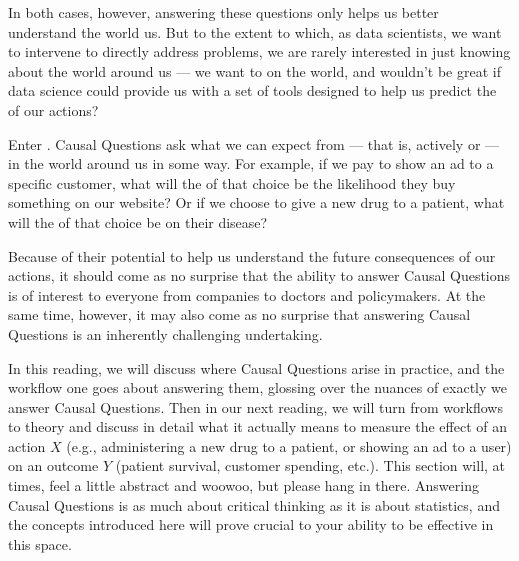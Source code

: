 \documentclass[letterpaper,10pt,english]{jupyterBook}
\begin{document}
\sphinxAtStartPar
In both cases, however, answering these questions only helps us better understand the world  us. But to the extent to which, as data scientists, we want to intervene to directly address problems, we are rarely interested in just knowing about the world around us — we want to  on the world, and wouldn’t be great if data science could provide us with a set of tools designed to help us predict the  of our actions?

\sphinxAtStartPar
Enter . Causal Questions ask what  we can expect from  — that is, actively  or  — in the world around us in some way. For example, if we pay to show an ad to a specific customer, what will the  of that choice be the likelihood they buy something on our website? Or if we choose to give a new drug to a patient, what will the  of that choice be on their disease?

\sphinxAtStartPar
Because of their potential to help us understand the future consequences of our actions, it should come as no surprise that the ability to answer Causal Questions is of  interest to everyone from companies to doctors and policymakers. At the same time, however, it may also come as no surprise that answering Causal Questions is an inherently challenging undertaking.

\sphinxAtStartPar
In this reading, we will discuss where Causal Questions arise in practice, and the workflow one goes about answering them, glossing over the nuances of  exactly we answer Causal Questions. Then in our next reading, we will turn from workflows to theory and discuss in detail what it actually means to measure the effect of an action \(X\) (e.g., administering a new drug to a patient, or showing an ad to a user) on an outcome \(Y\) (patient survival, customer spending, etc.). This section will, at times, feel a little abstract and woo\sphinxhyphen{}woo, but please hang in there. Answering Causal Questions is as much about critical thinking as it is about statistics, and the concepts introduced here will prove crucial to your ability to be effective in this space.
\end{document}
